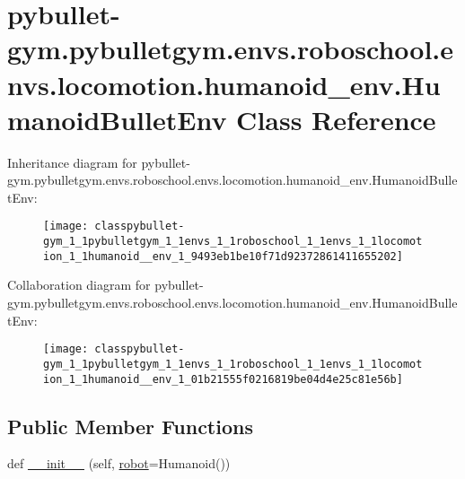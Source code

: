 \hypertarget{classpybullet-gym_1_1pybulletgym_1_1envs_1_1roboschool_1_1envs_1_1locomotion_1_1humanoid__env_1_1_humanoid_bullet_env}{}\section{pybullet-\/gym.pybulletgym.\+envs.\+roboschool.\+envs.\+locomotion.\+humanoid\+\_\+env.\+Humanoid\+Bullet\+Env Class Reference}
\label{classpybullet-gym_1_1pybulletgym_1_1envs_1_1roboschool_1_1envs_1_1locomotion_1_1humanoid__env_1_1_humanoid_bullet_env}


Inheritance diagram for pybullet-\/gym.pybulletgym.\+envs.\+roboschool.\+envs.\+locomotion.\+humanoid\+\_\+env.\+Humanoid\+Bullet\+Env\+:
\nopagebreak
\begin{figure}[H]
\begin{center}
\leavevmode
\texttt{[image: classpybullet-gym\_1\_1pybulletgym\_1\_1envs\_1\_1roboschool\_1\_1envs\_1\_1locomotion\_1\_1humanoid\_\_env\_1\_9493eb1be10f71d92372861411655202]}
\end{center}
\end{figure}


Collaboration diagram for pybullet-\/gym.pybulletgym.\+envs.\+roboschool.\+envs.\+locomotion.\+humanoid\+\_\+env.\+Humanoid\+Bullet\+Env\+:
\nopagebreak
\begin{figure}[H]
\begin{center}
\leavevmode
\texttt{[image: classpybullet-gym\_1\_1pybulletgym\_1\_1envs\_1\_1roboschool\_1\_1envs\_1\_1locomotion\_1\_1humanoid\_\_env\_1\_01b21555f0216819be04d4e25c81e56b]}
\end{center}
\end{figure}
\subsection*{Public Member Functions}
\begin{DoxyCompactItemize}
\item 
def \hyperlink{classpybullet-gym_1_1pybulletgym_1_1envs_1_1roboschool_1_1envs_1_1locomotion_1_1humanoid__env_1_1_humanoid_bullet_env_a86c00bad9aac237fc5360440d4c915e9}{\+\_\+\+\_\+init\+\_\+\+\_\+} (self, \hyperlink{classpybullet-gym_1_1pybulletgym_1_1envs_1_1roboschool_1_1envs_1_1locomotion_1_1humanoid__env_1_1_humanoid_bullet_env_a1c48a5cf921c9241ee545daea04d7b3b}{robot}=Humanoid())
\end{DoxyCompactItemize}
